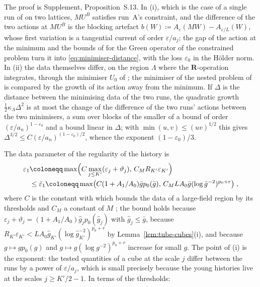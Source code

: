 \documentclass[11pt]{preprint}
\numberwithin{equation}{section}
\theoremstyle{definition}
\theoremstyle{remark}
\theoremstyle{plain}
\begin{document}
The proof is Supplement, Proposition~S.13. In (i), which is the case of a single run of \cite[Theorem~1]{BalabanVAR} on two lattices, $MU^B$ satisfies run~A's constraint, and the difference of the two actions at $MU^B$ is the blocking artefact $b(W) \coloneqq A_\varepsilon(MW) - A_{\varepsilon/L}(W)$, whose first variation is a tangential current of order $\varepsilon/a_j$; the gap of the action at the minimum and the bounds of \cite{BalabanPBG} for the Green operator of the constrained problem turn it into \eqref{eq:minimiser-distance}, with the loss $\varepsilon_0$ in the H\"older norm. In (ii) the data themselves differ, on the region $\Lambda$ where the $\mathbf R$-operation integrates, through the minimiser $U_0$ of \cite[(1.3), p.~357]{BalabanLFR2}; the minimiser of the nested problem of \cite[Proposition~1, p.~194]{BalabanLFR1} is compared by the growth of its action away from the minimum. If $\Delta$ is the distance between the minimising data of the two runs, the quadratic growth $\frac12\kappa_\Lambda\Delta^2$ is at most the change of the difference of the two runs' actions between the two minimisers, a sum over blocks of the smaller of a bound of order $(\varepsilon/a_n)^{1-\varepsilon_0}$ and a bound linear in $\Delta$; with $\min(u, v) \leq (uv)^{1/2}$ this gives $\Delta^{3/2} \leq C(\varepsilon/a_n)^{(1-\varepsilon_0)/2}$, whence the exponent $(1 - \varepsilon_0)/3$.

The data parameter of the regularity of the history is
\begin{equation}\label{eq:data-parameter}
\begin{aligned}
    \varepsilon_1 &\coloneqq \max\Bigl(C\max_{j \leq K'}(\varepsilon_j + \vartheta_j),\, C_MR_{K'}\varepsilon_{K'}\Bigr)\\
    &\leq \bar\varepsilon_1 \coloneqq \max\bigl(C(1 + A_1/A_0)\bar gp_0(\bar g),\, C_MLA_0\bar g(\log\bar g^{-2})^{p_0+r}\bigr)\;,
\end{aligned}
\end{equation}
where $C$ is the constant with which \cite[p.~178]{BalabanLFR1} bounds the data of a large-field region by its thresholds and $C_M$ a constant of $M$ \cite[(1.83), p.~197]{BalabanLFR1}; the bound holds because $\varepsilon_j + \vartheta_j = (1 + A_1/A_0)\hat g_jp_0(\hat g_j)$ with $\hat g_j \leq \bar g$, because $R_{K'}\varepsilon_{K'} < LA_0\hat g_{K'}(\log\hat g_{K'}^{-2})^{p_0+r}$ by Lemma~\ref{lem:tube-cubes}(i), and because $g \mapsto gp_0(g)$ and $g \mapsto g(\log g^{-2})^{p_0+r}$ increase for small $g$. The point of (i) is the exponent: the tested quantities of a cube at the scale $j$ differ between the runs by a power of $\varepsilon/a_j$, which is small precisely because the young histories live at the scales $j \geq K'/2 - 1$. In terms of the thresholds:
\end{document}
